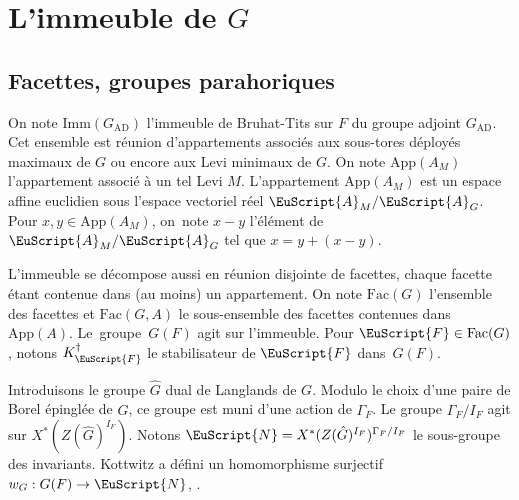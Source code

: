 \documentclass[JEP,XML,SOM,Unicode,francais]{cedram}
\let\mathcal \EuScript
\let\oldS\S
\renewcommand{\S}{\oldS\,}
\newcommand{\AD}{\mathrm{AD}}
\newcommand{\App}{\mathrm{App}}
\newcommand{\Fac}{\mathrm{Fac}}
\newcommand{\Imm}{\mathrm{Imm}}
\newcommand{\cA}{\mathcal{A}}
\newcommand{\cF}{\mathcal{F}}
\newcommand{\cN}{\mathcal{N}}
\theoremstyle{plain}
\theoremstyle{definition}
\begin{document}
\section{L'immeuble de \texorpdfstring{$G$}{G}}

\subsection{Facettes, groupes parahoriques}\label{facettes}

On note $\Imm(G_{\AD})$ l'immeuble de Bruhat-Tits sur $F$ du groupe adjoint $G_{\AD}$. Cet ensemble est réunion d'appartements associés aux sous-tores déployés maximaux de $G$ ou encore aux Levi minimaux de $G$. On note $\App(A_{M})$ l'appartement associé à un tel Levi $M$. L'appartement $\App(A_{M})$ est un espace affine euclidien sous l'espace vectoriel réel $\cA_{M}/\cA_{G}$. Pour $x,y\in \App(A_{M})$, on~note $x-y$ l'élément de $\cA_{M}/\cA_{G}$ tel que $x=y+(x-y)$.

L'immeuble se décompose aussi en réunion disjointe de facettes, chaque facette étant contenue dans (au moins) un appartement. On note $\Fac(G)$ l'ensemble des facettes et $\Fac(G,A)$ le sous-ensemble des facettes contenues dans $\App(A)$. Le~grou\-pe~$G(F)$ agit sur l'immeuble. Pour $\cF\in \Fac(G)$, notons $K_{\cF}^{\dag}$ le stabilisateur de $\cF$ dans~$G(F)$.

Introduisons le groupe $\hat{G}$ dual de Langlands de $G$. Modulo le choix d'une paire de Borel épinglée de $\hat{G}$, ce groupe est muni d'une action de $\Gamma_{F}$. Le groupe $\Gamma_{F}/I_{F}$ agit sur $X^*(Z(\hat{G})^{I_{F}})$. Notons $\cN=X^{*}(Z(\hat{G})^{I_{F}})^{\Gamma_{F}/I_{F}}$ le sous-groupe des invariants. Kottwitz a défini un homomorphisme surjectif $w_{G}:G(F)\to \cN$, \cf \cite[\S7]{K}.
\end{document}
